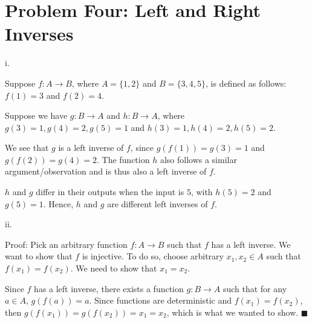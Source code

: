 \documentclass{article}
\renewcommand{\(}{\left(}
\renewcommand{\)}{\right)}
\theoremstyle{plain}
\theoremstyle{plain}
\theoremstyle{definition}
\begin{document}
\newpage

\section*{Problem Four: Left and Right Inverses}
    i.
    \begin{shaded}
        Suppose $f:A\to B$, where $A=\{1,2\}$ and $B=\{3,4,5\}$, is defined as follows: $f(1)=3$ and $f(2)=4$.

        \vspace{4mm}

        Suppose we have $g:B\to A$ and $h:B\to A$, where $g(3)=1,g(4)=2,g(5)=1$ and $h(3)=1,h(4)=2,h(5)=2$.

        \vspace{4mm}

        We see that $g$ is a left inverse of $f$, since $g(f(1))=g(3)=1$ and $g(f(2))=g(4)=2$. The function $h$ also follows a similar argument/observation and is thus also a left inverse of $f$.

        \vspace{4mm}

        $h$ and $g$ differ in their outputs when the input is $5$, with $h(5)=2$ and $g(5)=1$. Hence, $h$ and $g$ are different left inverses of $f$.
    \end{shaded}
    
    ii.
    \begin{shaded}
        Proof: Pick an arbitrary function $f:A\to B$ such that $f$ has a left inverse. We want to show that $f$ is injective. To do so, choose arbitrary $x_{1},x_{2}\in A$ such that $f(x_{1})=f(x_{2})$. We need to show that $x_{1}=x_{2}$.

        \vspace{4mm}

        Since $f$ has a left inverse, there exists a function $g:B\to A$ such that for any $a\in A$, $g(f(a))=a$. Since functions are deterministic and $f(x_{1})=f(x_{2})$, then $g(f(x_{1}))=g(f(x_{2}))=x_{1}=x_{2}$, which is what we wanted to show. $\blacksquare$
    \end{shaded}
    
\end{document}

